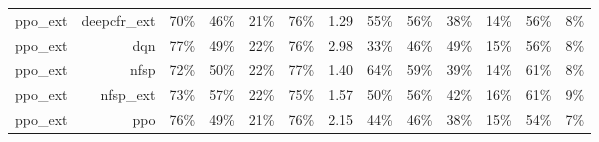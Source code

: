 \begin{tabular}{lrrrrrrrrrrrr}
ppo\_ext & deepcfr\_ext & 70\% & 46\% & 21\% & 76\% & 1.29 & 55\% & 56\% & 38\% & 14\% & 56\% & 8\% \\
ppo\_ext & dqn & 77\% & 49\% & 22\% & 76\% & 2.98 & 33\% & 46\% & 49\% & 15\% & 56\% & 8\% \\
ppo\_ext & nfsp & 72\% & 50\% & 22\% & 77\% & 1.40 & 64\% & 59\% & 39\% & 14\% & 61\% & 8\% \\
ppo\_ext & nfsp\_ext & 73\% & 57\% & 22\% & 75\% & 1.57 & 50\% & 56\% & 42\% & 16\% & 61\% & 9\% \\
ppo\_ext & ppo & 76\% & 49\% & 21\% & 76\% & 2.15 & 44\% & 46\% & 38\% & 15\% & 54\% & 7\% \\
\bottomrule
\end{tabular}
